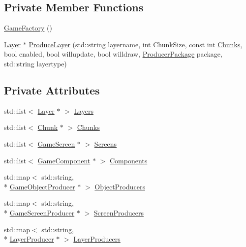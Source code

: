 \subsection*{Private Member Functions}
\begin{DoxyCompactItemize}
\item 
\hyperlink{class_game_factory_a37c039131801be05d138bd76bb125ab3}{Game\-Factory} ()
\item 
\hyperlink{class_layer}{Layer} $\ast$ \hyperlink{class_game_factory_a0c24ad925bf672c6fb721dfaaf993f9d}{Produce\-Layer} (std\-::string layername, int Chunk\-Size, const int \hyperlink{class_game_factory_a77496a7ea1e2fa54acb18c499b3bd3bb}{Chunks}, bool enabled, bool willupdate, bool willdraw, \hyperlink{class_producer_package}{Producer\-Package} package, std\-::string layertype)
\end{DoxyCompactItemize}
\subsection*{Private Attributes}
\begin{DoxyCompactItemize}
\item 
std\-::list$<$ \hyperlink{class_layer}{Layer} $\ast$ $>$ \hyperlink{class_game_factory_a7ab6a968cb7af49813407fe66927c126}{Layers}
\item 
std\-::list$<$ \hyperlink{class_chunk}{Chunk} $\ast$ $>$ \hyperlink{class_game_factory_a77496a7ea1e2fa54acb18c499b3bd3bb}{Chunks}
\item 
std\-::list$<$ \hyperlink{class_game_screen}{Game\-Screen} $\ast$ $>$ \hyperlink{class_game_factory_a16a8135f6d6b1b60c0d08b39340b34cc}{Screens}
\item 
std\-::list$<$ \hyperlink{class_game_component}{Game\-Component} $\ast$ $>$ \hyperlink{class_game_factory_a90fc6360610babaf3d2d880f782772b3}{Components}
\item 
std\-::map$<$ std\-::string, \\*
\hyperlink{class_game_object_producer}{Game\-Object\-Producer} $\ast$ $>$ \hyperlink{class_game_factory_ab72819fc3f241243d44827f75e0a2886}{Object\-Producers}
\item 
std\-::map$<$ std\-::string, \\*
\hyperlink{class_game_screen_producer}{Game\-Screen\-Producer} $\ast$ $>$ \hyperlink{class_game_factory_aa65ba67e6c3fc56ec228c801e02352c8}{Screen\-Producers}
\item 
std\-::map$<$ std\-::string, \\*
\hyperlink{class_layer_producer}{Layer\-Producer} $\ast$ $>$ \hyperlink{class_game_factory_adfadca1996a3982f4b45c67ced1520f2}{Layer\-Producers}
\end{DoxyCompactItemize}



